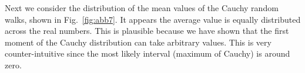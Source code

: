 \documentclass[12pt]{article}
\begin{document}
 
 
  Next we consider the distribution of the mean values of the 
  Cauchy random walks, shown in Fig.~\ref{fig:abb7}.
  It appears the average value is equally distributed across the real numbers.
  This is plausible because we have shown that the first moment of
  the Cauchy distribution can take arbitrary values.
  This is very counter-intuitive since the most likely interval (maximum of Cauchy) is around zero.

 
\end{document}
